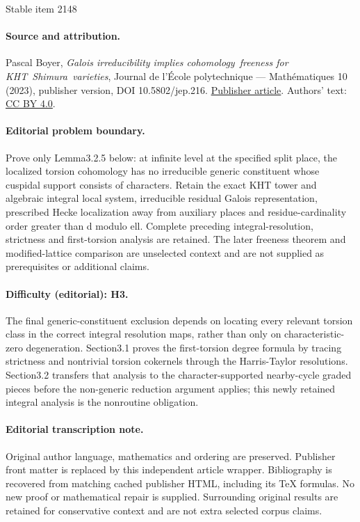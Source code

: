 \documentclass[11pt]{article}
\theoremstyle{plain}
\theoremstyle{definition}
\numberwithin{equation}{subsection}
\begin{document}
\begin{center}{\Large Stable item 2148}\end{center}
\paragraph{Source and attribution.}
Pascal Boyer, \emph{Galois irreducibility implies cohomology freeness for KHT Shimura varieties}, Journal de l’École polytechnique — Mathématiques 10 (2023), publisher version, DOI 10.5802/jep.216. \href{https://jep.centre-mersenne.org/articles/10.5802/jep.216/}{Publisher article}. Authors' text: \href{https://creativecommons.org/licenses/by/4.0/}{CC BY 4.0}.
\paragraph{Editorial problem boundary.}
Prove only Lemma3.2.5 below: at infinite level at the specified split place, the localized torsion cohomology has no irreducible generic constituent whose cuspidal support consists of characters. Retain the exact KHT tower and algebraic integral local system, irreducible residual Galois representation, prescribed Hecke localization away from auxiliary places and residue-cardinality order greater than d modulo ell. Complete preceding integral-resolution, strictness and first-torsion analysis are retained. The later freeness theorem and modified-lattice comparison are unselected context and are not supplied as prerequisites or additional claims.
\paragraph{Difficulty (editorial): H3.}
The final generic-constituent exclusion depends on locating every relevant torsion class in the correct integral resolution maps, rather than only on characteristic-zero degeneration. Section3.1 proves the first-torsion degree formula by tracing strictness and nontrivial torsion cokernels through the Harris-Taylor resolutions. Section3.2 transfers that analysis to the character-supported nearby-cycle graded pieces before the non-generic reduction argument applies; this newly retained integral analysis is the nonroutine obligation.
\paragraph{Editorial transcription note.}
Original author language, mathematics and ordering are preserved. Publisher front matter is replaced by this independent article wrapper. Bibliography is recovered from matching cached publisher HTML, including its TeX formulas. No new proof or mathematical repair is supplied. Surrounding original results are retained for conservative context and are not extra selected corpus claims.
\clearpage
\end{document}
